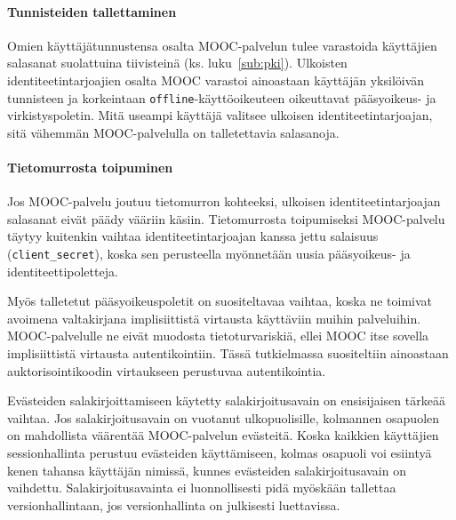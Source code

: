 \documentclass[finnish,gradu]{tktltiki}
\begin{document}

  \paragraph{Tunnisteiden tallettaminen} \hfill %
  \label{par:tietoturva}

  Omien käyttäjätunnustensa osalta MOOC-palvelun tulee varastoida käyttäjien salasanat suolattuina tiivisteinä (ks. luku~\ref{sub:pki}). Ulkoisten identiteetintarjoajien osalta MOOC varastoi ainoastaan käyttäjän yksilöivän tunnisteen ja korkeintaan \verb!offline!-käyttöoikeuteen oikeuttavat pääsyoikeus- ja virkistyspoletin. Mitä useampi käyttäjä valitsee ulkoisen identiteetintarjoajan, sitä vähemmän MOOC-palvelulla on talletettavia salasanoja.


  \paragraph{Tietomurrosta toipuminen} \hfill %
  \label{par:tietomurrosta_toipuminen}

  Jos MOOC-palvelu joutuu tietomurron kohteeksi, ulkoisen identiteetintarjoajan salasanat eivät päädy vääriin käsiin. Tietomurrosta toipumiseksi MOOC-palvelu täytyy kuitenkin vaihtaa identiteetintarjoajan kanssa jettu salaisuus (\verb!client_secret!), koska sen perusteella myönnetään uusia pääsyoikeus- ja identiteettipoletteja.

  Myös talletetut pääsyoikeuspoletit on suositeltavaa vaihtaa, koska ne toimivat avoimena valtakirjana implisiittistä virtausta käyttäviin muihin palveluihin. MOOC-palvelulle ne eivät muodosta tietoturvariskiä, ellei MOOC itse sovella implisiittistä virtausta autentikointiin. Tässä tutkielmassa suositeltiin ainoastaan auktorisointikoodin virtaukseen perustuvaa autentikointia.

  Evästeiden salakirjoittamiseen käytetty salakirjoitusavain on ensisijaisen tärkeää vaihtaa. Jos salakirjoitusavain on vuotanut ulkopuolisille, kolmannen osapuolen on mahdollista väärentää MOOC-palvelun evästeitä. Koska kaikkien käyttäjien sessionhallinta perustuu evästeiden käyttämiseen, kolmas osapuoli voi esiintyä kenen tahansa käyttäjän nimissä, kunnes evästeiden salakirjoitusavain on vaihdettu. Salakirjoitusavainta ei luonnollisesti pidä myöskään tallettaa versionhallintaan, jos versionhallinta on julkisesti luettavissa.

\end{document}
